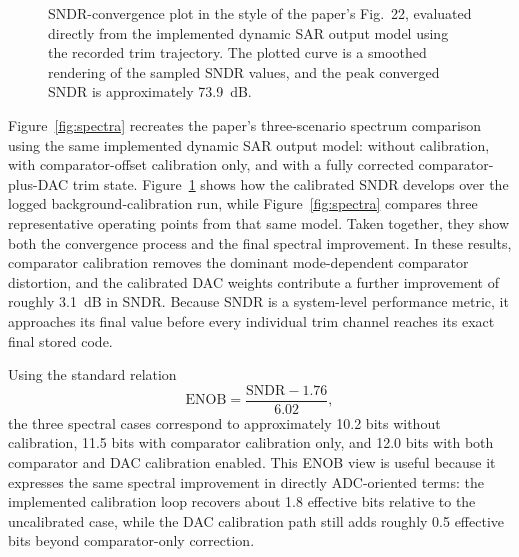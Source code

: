 \documentclass[11pt]{article}
\begin{document}
\begin{figure}[H]
\centering
{}
\caption{SNDR-convergence plot in the style of the paper's Fig.~22, evaluated directly from the implemented dynamic SAR output model using the recorded trim trajectory. The plotted curve is a smoothed rendering of the sampled SNDR values, and the peak converged SNDR is approximately \SI{73.9}{dB}.}
\label{fig:sndrconv}
\end{figure}

Figure~\ref{fig:spectra} recreates the paper's \cite{ding2017} three-scenario spectrum comparison using the same implemented dynamic SAR output model: without calibration, with comparator-offset calibration only, and with a fully corrected comparator-plus-DAC trim state. Figure~\ref{fig:sndrconv} shows how the calibrated SNDR develops over the logged background-calibration run, while Figure~\ref{fig:spectra} compares three representative operating points from that same model. Taken together, they show both the convergence process and the final spectral improvement. In these results, comparator calibration removes the dominant mode-dependent comparator distortion, and the calibrated DAC weights contribute a further improvement of roughly \SI{3.1}{dB} in SNDR. Because SNDR is a system-level performance metric, it approaches its final value before every individual trim channel reaches its exact final stored code.

Using the standard relation
\[
\mathrm{ENOB} = \frac{\mathrm{SNDR} - 1.76}{6.02},
\]
the three spectral cases correspond to approximately 10.2 bits without calibration, 11.5 bits with comparator calibration only, and 12.0 bits with both comparator and DAC calibration enabled. This ENOB view is useful because it expresses the same spectral improvement in directly ADC-oriented terms: the implemented calibration loop recovers about 1.8 effective bits relative to the uncalibrated case, while the DAC calibration path still adds roughly 0.5 effective bits beyond comparator-only correction.
\end{document}
